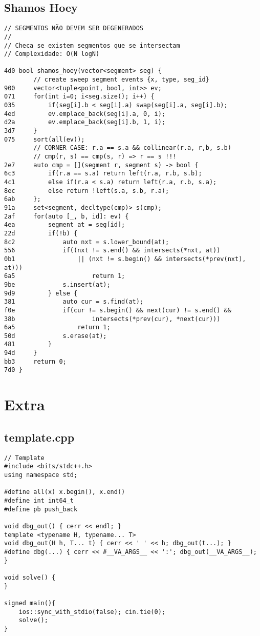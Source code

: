 \documentclass[11pt, a4paper, twoside]{article}
\begin{document}
\subsection{Shamos Hoey}
\begin{lstlisting}
// SEGMENTOS NÃO DEVEM SER DEGENERADOS
//
// Checa se existem segmentos que se intersectam
// Complexidade: O(N logN)

4d0 bool shamos_hoey(vector<segment> seg) {
    	// create sweep segment events {x, type, seg_id}
900 	vector<tuple<point, bool, int>> ev;
071 	for(int i=0; i<seg.size(); i++) {
035 		if(seg[i].b < seg[i].a) swap(seg[i].a, seg[i].b);
4ed 		ev.emplace_back(seg[i].a, 0, i);
d2a 		ev.emplace_back(seg[i].b, 1, i);
3d7 	}
075 	sort(all(ev));
    	// CORNER CASE: r.a == s.a && collinear(r.a, r,b, s.b) 
    	// cmp(r, s) == cmp(s, r) => r == s !!!
2e7 	auto cmp = [](segment r, segment s) -> bool {
6c3 		if(r.a == s.a) return left(r.a, r.b, s.b);
4c1 		else if(r.a < s.a) return left(r.a, r.b, s.a);
8ec 		else return !left(s.a, s.b, r.a);
6ab 	};
91a 	set<segment, decltype(cmp)> s(cmp);
2af 	for(auto [_, b, id]: ev) {
4ea 		segment at = seg[id];
22d 		if(!b) {
8c2 			auto nxt = s.lower_bound(at);
556 			if((nxt != s.end() && intersects(*nxt, at))
0b1 				|| (nxt != s.begin() && intersects(*prev(nxt), at)))
6a5 					return 1;
9be 			s.insert(at);
9d9 		} else {
381 			auto cur = s.find(at);
f0e 			if(cur != s.begin() && next(cur) != s.end() && 
38b 					intersects(*prev(cur), *next(cur))) 
6a5 				return 1;
50d 			s.erase(at);
481 		}
94d 	}
bb3 	return 0;
7d0 }
\end{lstlisting}

\pagebreak


%
%

\section{Extra}

\subsection{template.cpp}
\begin{lstlisting}
// Template
#include <bits/stdc++.h>
using namespace std;

#define all(x) x.begin(), x.end()
#define int int64_t
#define pb push_back

void dbg_out() { cerr << endl; }
template <typename H, typename... T>
void dbg_out(H h, T... t) { cerr << ' ' << h; dbg_out(t...); }
#define dbg(...) { cerr << #__VA_ARGS__ << ':'; dbg_out(__VA_ARGS__); }

void solve() {
}

signed main(){
	ios::sync_with_stdio(false); cin.tie(0);
	solve();
}
\end{lstlisting}
\end{document}
